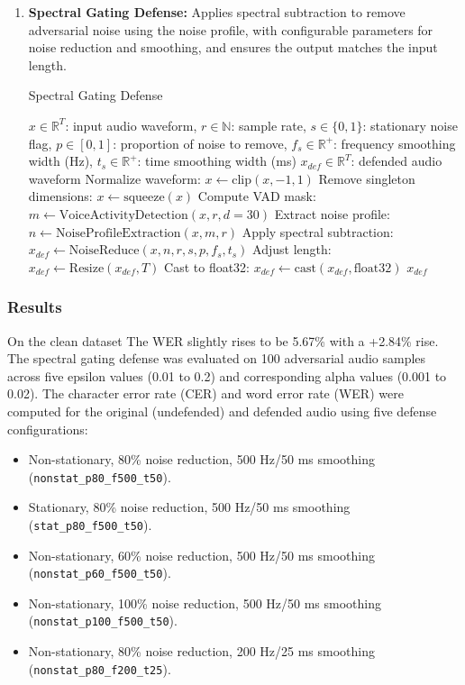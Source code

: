 \documentclass[../main.tex]{subfiles}
\begin{document}
\begin{enumerate}
    \item \textbf{Spectral Gating Defense:} Applies spectral subtraction to remove adversarial noise using the noise profile, with configurable parameters for noise reduction and smoothing, and ensures the output matches the input length.

    \begin{breakablealgorithm}{Spectral Gating Defense}
    \begin{algorithmic}[1]
    \Require $x \in \mathbb{R}^T$: input audio waveform, $r \in \mathbb{N}$: sample rate, $s \in \{0, 1\}$: stationary noise flag, $p \in [0, 1]$: proportion of noise to remove, $f_s \in \mathbb{R}^+$: frequency smoothing width (Hz), $t_s \in \mathbb{R}^+$: time smoothing width (ms)
    \Ensure $x_{def} \in \mathbb{R}^T$: defended audio waveform
    \State Normalize waveform: $x \gets \text{clip}(x, -1, 1)$ 
    \State Remove singleton dimensions: $x \gets \text{squeeze}(x)$ 
    \State Compute VAD mask: $m \gets \text{VoiceActivityDetection}(x, r, d=30)$ 
    \State Extract noise profile: $n \gets \text{NoiseProfileExtraction}(x, m, r)$ 
    \State Apply spectral subtraction: $x_{def} \gets \text{NoiseReduce}(x, n, r, s, p, f_s, t_s)$ 
    \State Adjust length: $x_{def} \gets \text{Resize}(x_{def}, T)$ 
    \State Cast to float32: $x_{def} \gets \text{cast}(x_{def}, \text{float32})$ 
    \State \Return $x_{def}$ 
    \end{algorithmic}
    \end{breakablealgorithm}
\end{enumerate}

\subsubsection{Results}
On the clean dataset The WER slightly rises to be 5.67\% with a +2.84\% rise.
The spectral gating defense was evaluated on 100 adversarial audio samples across five epsilon values (0.01 to 0.2) and corresponding alpha values (0.001 to 0.02). The character error rate (CER) and word error rate (WER) were computed for the original (undefended) and defended audio using five defense configurations:
\begin{itemize}
    \item Non-stationary, 80\% noise reduction, 500 Hz/50 ms smoothing (\texttt{nonstat\_p80\_f500\_t50}).
    \item Stationary, 80\% noise reduction, 500 Hz/50 ms smoothing (\texttt{stat\_p80\_f500\_t50}).
    \item Non-stationary, 60\% noise reduction, 500 Hz/50 ms smoothing (\texttt{nonstat\_p60\_f500\_t50}).
    \item Non-stationary, 100\% noise reduction, 500 Hz/50 ms smoothing (\texttt{nonstat\_p100\_f500\_t50}).
    \item Non-stationary, 80\% noise reduction, 200 Hz/25 ms smoothing (\texttt{nonstat\_p80\_f200\_t25}).
\end{itemize}
\end{document}
